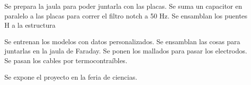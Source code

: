 \documentclass{article}
\begin{document}
Se prepara la jaula para poder juntarla con las placas. Se suma un capacitor en paralelo a las placas para correr el filtro notch a 50 Hz. Se ensamblan los puentes H a la estructura

Se entrenan los modelos con datos personalizados. Se ensamblan las cosas para juntarlas en la jaula de Faraday. Se ponen los mallados para pasar los electrodos. Se pasan los cables por termocontraíbles.

Se expone el proyecto en la feria de ciencias.
\end{document}
